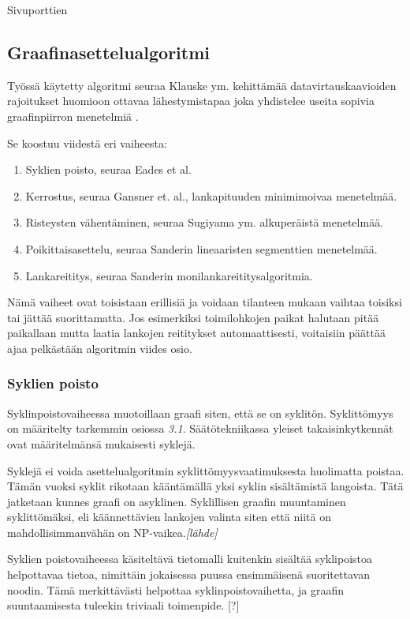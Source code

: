 \documentclass[finnish,12pt]{article}
\begin{document}
Sivuporttien 

		\subsection{Graafinasettelualgoritmi}

Työssä käytetty algoritmi seuraa Klauske ym. kehittämää datavirtauskaavioiden rajoitukset huomioon ottavaa lähestymistapaa joka yhdistelee useita sopivia graafinpiirron menetelmiä \cite{RefWorks:50}.

Se koostuu viidestä eri vaiheesta:
\begin{enumerate}
  \item Syklien poisto, seuraa Eades et al.\cite{RefWorks:48}
  \item Kerrostus, seuraa Gansner et. al., lankapituuden minimimoivaa menetelmää. \cite{RefWorks:28}
  \item Risteysten vähentäminen, seuraa Sugiyama ym. alkuperäistä menetelmää. \cite{RefWorks:9}
  \item Poikittaisasettelu, seuraa Sanderin lineaaristen segmenttien menetelmää. \cite{RefWorks:49}
  \item Lankareititys, seuraa Sanderin monilankareititysalgoritmia. \cite{RefWorks:17}
\end{enumerate}

Nämä vaiheet ovat toisistaan erillisiä ja voidaan tilanteen mukaan vaihtaa toisiksi tai jättää suorittamatta.
Jos esimerkiksi toimilohkojen paikat halutaan pitää paikallaan mutta laatia lankojen reititykset automaattisesti, voitaisiin päättää ajaa pelkästään algoritmin viides osio.

		
		\subsubsection{Syklien poisto}

Syklinpoistovaiheessa muotoillaan graafi siten, että se on syklitön.
Syklittömyys on määritelty tarkemmin osiossa \emph{3.1}.
Säätötekniikassa yleiset takaisinkytkennät ovat määritelmänsä mukaisesti syklejä.

Syklejä ei voida asettelualgoritmin syklittömyysvaatimuksesta huolimatta poistaa.
Tämän vuoksi syklit rikotaan kääntämällä yksi syklin sisältämistä langoista.
Tätä jatketaan kunnes graafi on asyklinen.
Syklillisen graafin muuntaminen syklittömäksi, eli käännettävien lankojen valinta siten että niitä on mahdollisimmanvähän on NP-vaikea.\emph{[lähde]}

Syklien poistovaiheessa käsiteltävä tietomalli kuitenkin sisältää syklipoistoa helpottavaa tietoa, nimittäin jokaisessa puussa ensimmäisenä suoritettavan noodin. Tämä merkittävästi helpottaa syklinpoistovaihetta, ja graafin suuntaamisesta tuleekin triviaali toimenpide. [?]
\end{document}
